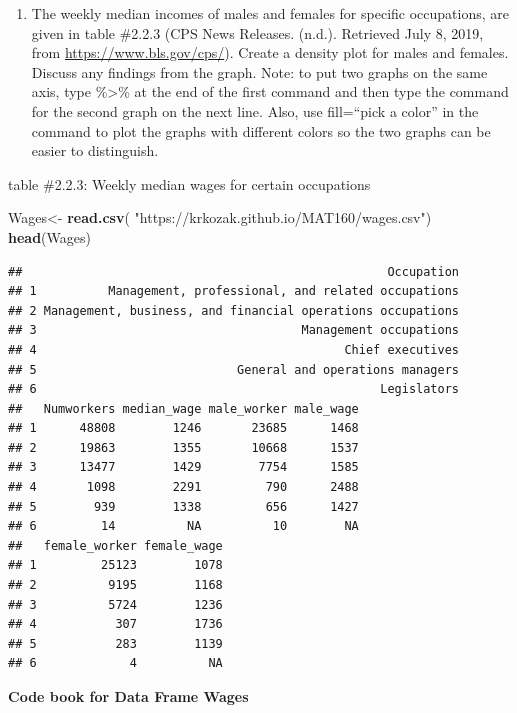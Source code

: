 \documentclass[
]{book}
\newenvironment{Shaded}{\begin{snugshade}}{\end{snugshade}}
\newcommand{\KeywordTok}[1]{\textcolor[rgb]{0.13,0.29,0.53}{\textbf{#1}}}
\newcommand{\NormalTok}[1]{#1}
\newcommand{\StringTok}[1]{\textcolor[rgb]{0.31,0.60,0.02}{#1}}
\providecommand{\tightlist}{%
  \setlength{\itemsep}{0pt}\setlength{\parskip}{0pt}}
\begin{document}
\begin{enumerate}
\def\labelenumi{\arabic{enumi}.}
\tightlist
\item
  The weekly median incomes of males and females for specific occupations, are given in table \#2.2.3 (CPS News Releases. (n.d.). Retrieved July 8, 2019, from \url{https://www.bls.gov/cps/}). Create a density plot for males and females. Discuss any findings from the graph. Note: to put two graphs on the same axis, type \%\textgreater\% at the end of the first command and then type the command for the second graph on the next line. Also, use fill=``pick a color'' in the command to plot the graphs with different colors so the two graphs can be easier to distinguish.
\end{enumerate}

table \#2.2.3: Weekly median wages for certain occupations

\begin{Shaded}
\begin{Highlighting}[]
\NormalTok{Wages<-}\StringTok{ }\KeywordTok{read.csv}\NormalTok{(}
  \StringTok{"https://krkozak.github.io/MAT160/wages.csv"}\NormalTok{)}
\KeywordTok{head}\NormalTok{(Wages)}
\end{Highlighting}
\end{Shaded}

\begin{verbatim}
##                                                   Occupation
## 1          Management, professional, and related occupations
## 2 Management, business, and financial operations occupations
## 3                                     Management occupations
## 4                                           Chief executives
## 5                            General and operations managers
## 6                                                Legislators
##   Numworkers median_wage male_worker male_wage
## 1      48808        1246       23685      1468
## 2      19863        1355       10668      1537
## 3      13477        1429        7754      1585
## 4       1098        2291         790      2488
## 5        939        1338         656      1427
## 6         14          NA          10        NA
##   female_worker female_wage
## 1         25123        1078
## 2          9195        1168
## 3          5724        1236
## 4           307        1736
## 5           283        1139
## 6             4          NA
\end{verbatim}

\textbf{Code book for Data Frame Wages}
\end{document}
